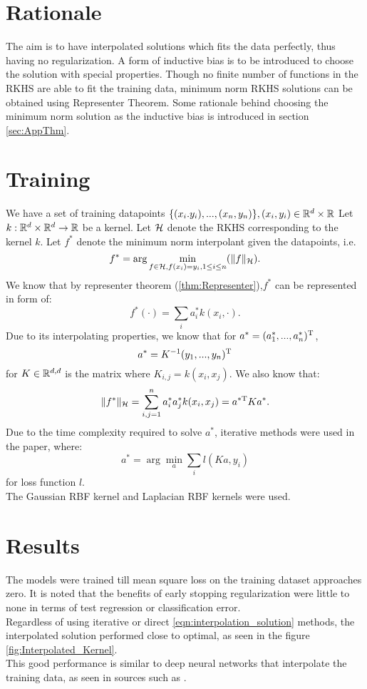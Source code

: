 \documentclass[twoside]{memoir}
\begin{document}
\section{Rationale}
The aim is to have interpolated solutions which fits the data perfectly, thus having no regularization. A form of inductive bias is to be introduced to choose the solution with special properties. Though no finite number of functions in the RKHS are able to fit the training data, minimum norm RKHS solutions can be obtained using Representer Theorem. Some rationale behind choosing the minimum norm solution as the inductive bias is introduced in section \ref{sec:AppThm}.
\section{Training}
We have a set of training datapoints $\{ (x_i. y_i), ..., (x_n, y_n) \}, (x_i, y_i) \in \mathbb{R}^d \times \mathbb{R}$
Let $k: \mathbb{R}^d \times \mathbb{R}^d \rightarrow \mathbb{R}$ be a kernel. Let $\mathcal{H}$ denote the RKHS corresponding to the kernel $k$. Let $f^*$ denote the minimum norm interpolant given the datapoints, i.e.
\begin{equation*}
f^* = \arg \min_{f \in \mathcal{H}, f(x_i) = y_i, 1 \leq i \leq n} (\lVert f\rVert_{\mathcal{H}}).
\end{equation*}
We know that by representer theorem (\ref{thm:Representer}),$f^*$ can be represented in form of:
\[ f^*(\cdot) = \sum_{i} a^*_i k(x_i, \cdot). \]
Due to its interpolating properties, we know that for $a^* = (a^*_1, ..., a^*_n)^{\text{T}}$,
\begin{equation} \label{eqn:interpolation_solution}
a^* = K^{-1} (y_1, ..., y_n)^{\text{T}}
\end{equation}
for $K \in \mathbb{R}^{d,d}$ is the matrix where $K_{i,j} = k(x_i, x_j)$.
We also know that:
\[ \lVert f^*\rVert_{\mathcal{H}} = \sum_{i,j=1}^{n} a^*_i a^*_j k(x_i, x_j) = a^{*\text{T}} K a^*. \]
Due to the time complexity required to solve $a^*$, iterative methods were used in the paper, where:
\begin{equation*}
a^* = \arg \min_{a} \sum_{i} l(Ka, y_i)
\end{equation*}
for loss function $l$.\\
The Gaussian RBF kernel and Laplacian RBF kernels were used.
\section{Results}
The models were trained till mean square loss on the training dataset approaches zero. It is noted that the benefits of early stopping regularization were little to none in terms of test regression or classification error.\\
Regardless of using iterative or direct \ref{eqn:interpolation_solution} methods, the interpolated solution performed close to optimal, as seen in the figure \ref{fig:Interpolated_Kernel}.\\
This good performance is similar to deep neural networks that interpolate the training data, as seen in sources such as \cite{Zhang_Deep_Learning}.
\end{document}

